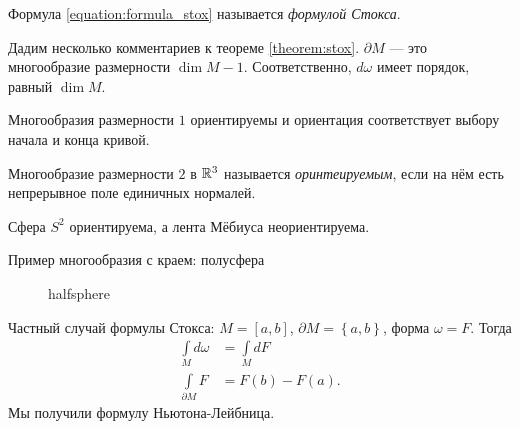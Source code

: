 Формула \eqref{equation:formula_stox} называется \textit{формулой Стокса}.

Дадим несколько комментариев к теореме \ref{theorem:stox}. $\partial M$ --- это многообразие размерности  $\dim M - 1$.  Соответственно, $d \omega$  имеет порядок, равный $\dim M$.

Многообразия размерности $1$  ориентируемы и ориентация соответствует выбору начала и конца кривой.

\begin{df}
 Многообразие размерности $2$ в $\mathbb{R}^{3}$ называется \textit{оринтеируемым}, если на нём есть непрерывное поле единичных нормалей.
\end{df}
\begin{exmpl*}
 Сфера $S^{2}$ ориентируема, а лента Мёбиуса неориентируема.
\end{exmpl*}
\begin{exmpl}
 Пример многообразия с краем: полусфера
\begin{figure}[ht]
    \centering
    \caption{halfsphere}
    \label{fig:halfsphere}
\end{figure}
\end{exmpl}

Частный случай формулы Стокса: $M = [a,b]$,  $\partial M = \left\{ a,b \right\}$, форма $\omega = F$. Тогда
 \begin{align*}
  \int\limits_{M} d\omega &= \int\limits_{M} d F \\
 \int\limits_{\partial M} F &= F(b) - F(a)
.\end{align*} Мы получили формулу Ньютона-Лейбница.

